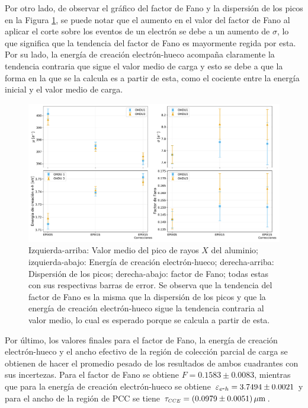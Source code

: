 Por otro lado, de observar el gráfico del factor de Fano y la dispersión de los picos en la Figura \ref{fig:Al_mu_sigma_fano_eh}, se puede notar que el aumento en el valor del factor de Fano al aplicar el corte sobre los eventos de un electrón se debe a un aumento de $\sigma$, lo que significa que la tendencia del factor de Fano es mayormente regida por esta. Por su lado, la energía de creación electrón-hueco acompaña claramente la tendencia contraria que sigue el valor medio de carga y esto se debe a que la forma en la que se la calcula es a partir de esta, como el cociente entre la energía inicial y el valor medio de carga.

\begin{figure}[h]
    \centering
        \includegraphics[scale=0.45]{Figs/Al_mu_sigma_fano_Eeh.pdf}
    \caption{Izquierda-arriba: Valor medio del pico de rayos $X$ del aluminio; izquierda-abajo: Energía de creación electrón-hueco; derecha-arriba: Dispersión de los picos; derecha-abajo: factor de Fano; todas estas con sus respectivas barras de error. Se observa que la tendencia del factor de Fano es la misma que la dispersión de los picos y que la energía de creación electrón-hueco sigue la tendencia contraria al valor medio, lo cual es esperado porque se calcula a partir de esta.}
    \label{fig:Al_mu_sigma_fano_eh}
\end{figure}

Por último, los valores finales para el factor de Fano, la energía de creación electrón-hueco y el ancho efectivo de la región de colección parcial de carga se obtienen de hacer el promedio pesado de los resultados de ambos cuadrantes con sus incertezas. Para el factor de Fano se obtiene $ F = 0.1583 \pm 0.0083 $, mientras que para la energía de creación electrón-hueco se obtiene $\varepsilon_{e\mbox{-}h} = 3.7494 \pm 0.0021 $ y para el ancho de la región de PCC se tiene $\tau_{\scaleto{CCE}{4pt}} = (0.0979 \pm 0.0051)\,\si{\mu m}$.
